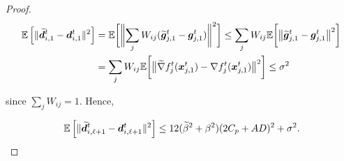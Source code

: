 \begin{proof}
\begin{align*}
\E \left[  \| \widetilde{\vect{d}}^t_{i,1} - \vect{d}^t_{i,1} \|^2 \right] 
&= \E \biggl[  \biggl \|  \sum_{j} W_{ij} (\widetilde{\vect{g}}^t_{j,1} - \vect{g}^t_{j,1}) \biggr \|^2 \biggr] 
\leq \sum_{j} W_{ij} \E \biggl[  \bigl \|  \widetilde{\vect{g}}^t_{j,1} - \vect{g}^t_{j,1} \bigr \|^2 \biggr] \\
%
&= \sum_{j} W_{ij} \E \biggl[  \bigl \|  \widetilde{\nabla} f^{t}_{j}(\vect{x}^{t}_{j,1}) -  \nabla f^{t}_{j}(\vect{x}^{t}_{j,1}) \bigr \|^2 \biggr] 
\leq \sigma^{2}
\end{align*}

since $\sum_{j} W_{ij} = 1$. Hence, 

\[
\mathbb{E} \left[  \| \widetilde{\bm{d}}^t_{i,\ell + 1} - \bm{d}^t_{i,\ell+1} \|^2 \right] 
\leq  12(\widetilde{\beta}^{2} + \beta^{2})(2C_{p} + AD)^{2} + \sigma^{2}. 
\]

\end{proof}

